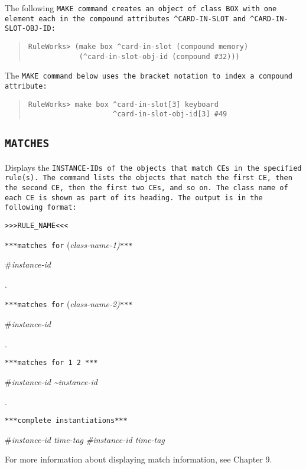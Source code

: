 The following \tt{MAKE} command creates an object of class \tt{BOX}
with one element each in the compound attributes \verb|^CARD-IN-SLOT|
and \verb|^CARD-IN-SLOT-OBJ-ID|:

\begin{quote}
\begin{verbatim}
RuleWorks> (make box ^card-in-slot (compound memory)
            (^card-in-slot-obj-id (compound #32)))
\end{verbatim}
\end{quote}

The \tt{MAKE} command below uses the bracket notation to index a
compound attribute:

\begin{quote}
\begin{verbatim}
RuleWorks> make box ^card-in-slot[3] keyboard 
                    ^card-in-slot-obj-id[3] #49
\end{verbatim}
\end{quote}

\subsection{\tt{MATCHES}}

Displays the \tt{INSTANCE-ID}s of the objects that match CEs in
the specified rule(s). The command lists the objects that
match the first CE, then the second CE, then the first two
CEs, and so on. The class name of each CE is shown as part of
its heading. The output is in the following format:

\verb|>>>RULE_NAME<<<|

\verb|***matches for| (\it{class-name-1})\verb|***|

\#\it{instance-id}

.

\verb|***matches for| (\it{class-name-2})\verb|***|

\#\it{instance-id}

.

\verb|***matches for 1 2 ***|

\#\it{instance-id} \textasciitilde\it{instance-id}

.

\verb|***complete instantiations***|

\#\it{instance-id} \it{time-tag} \#\it{instance-id} \it{time-tag}

For more information about displaying match information, see
Chapter 9.

\Format

